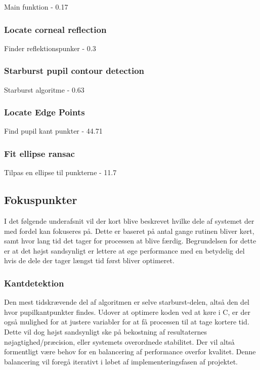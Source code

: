 \documentclass[rapport.tex]{subfiles}
\begin{document}
	Main funktion - 0.17%
	
	\subsubsection{Locate corneal reflection}
	
	Finder reflektionspunker - 0.3%
	
	\subsubsection{Starburst pupil contour detection}
	
	Starburst algoritme - 0.63%
	
	\subsubsection{Locate Edge Points}
	
	Find pupil kant punkter - 44.71%
	
	\subsubsection{Fit ellipse ransac}
	
	Tilpas en ellipse til punkterne - 11.7%
	
	\subsection{Fokuspunkter}
	I det følgende underafsnit vil der kort blive beskrevet hvilke dele af systemet der med fordel kan fokuseres på. Dette er baseret på antal gange rutinen bliver kørt, samt hvor lang tid det tager for processen at blive færdig. Begrundelsen for dette er at det højst sandsynligt er lettere at øge performance med en betydelig del hvis de dele der tager længst tid først bliver optimeret.
	
	\subsubsection{Kantdetektion}
	Den mest tidskrævende del af algoritmen er selve starburst-delen, altså den del hvor pupilkantpunkter findes. Udover at optimere koden ved at køre i C, er der også mulighed for at justere variabler for at få processen til at tage kortere tid. Dette vil dog højst sandsynligt ske på bekostning af resultaternes nøjagtighed/præcision, eller systemets overordnede stabilitet. Der vil altså formentligt være behov for en balancering af performance overfor kvalitet. Denne balancering vil foregå iterativt i løbet af implementeringsfasen af projektet.
	
\end{document}
